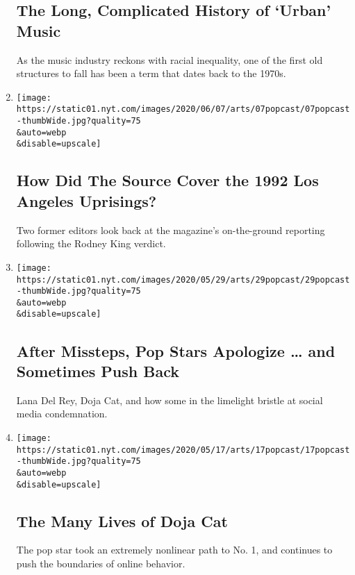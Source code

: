 \begin{enumerate}
  \hypertarget{the-long-complicated-history-of-urban-music}{%
  \subsection{The Long, Complicated History of `Urban'
  Music}\label{the-long-complicated-history-of-urban-music}}

  As the music industry reckons with racial inequality, one of the first
  old structures to fall has been a term that dates back to the 1970s.
\item
  \href{/2020/06/07/arts/music/popcast-the-source-rodney-king.html}{}

  \texttt{[image: https://static01.nyt.com/images/2020/06/07/arts/07popcast/07popcast-thumbWide.jpg?quality=75\\\&auto=webp\\\&disable=upscale]}

  \hypertarget{how-did-the-source-cover-the-1992-los-angeles-uprisings}{%
  \subsection{How Did The Source Cover the 1992 Los Angeles
  Uprisings?}\label{how-did-the-source-cover-the-1992-los-angeles-uprisings}}

  Two former editors look back at the magazine's on-the-ground reporting
  following the Rodney King verdict.
\item
  \href{/2020/06/01/arts/music/popcast-lana-del-rey-doja-cat-apologies.html}{}

  \texttt{[image: https://static01.nyt.com/images/2020/05/29/arts/29popcast/29popcast-thumbWide.jpg?quality=75\\\&auto=webp\\\&disable=upscale]}

  \hypertarget{after-missteps-pop-stars-apologize--and-sometimes-push-back}{%
  \subsection{After Missteps, Pop Stars Apologize \ldots{} and Sometimes
  Push
  Back}\label{after-missteps-pop-stars-apologize--and-sometimes-push-back}}

  Lana Del Rey, Doja Cat, and how some in the limelight bristle at
  social media condemnation.
\item
  \href{/2020/05/18/arts/music/popcast-doja-cat.html}{}

  \texttt{[image: https://static01.nyt.com/images/2020/05/17/arts/17popcast/17popcast-thumbWide.jpg?quality=75\\\&auto=webp\\\&disable=upscale]}

  \hypertarget{the-many-lives-of-doja-cat}{%
  \subsection{The Many Lives of Doja
  Cat}\label{the-many-lives-of-doja-cat}}

  The pop star took an extremely nonlinear path to No. 1, and continues
  to push the boundaries of online behavior.
\end{enumerate}

